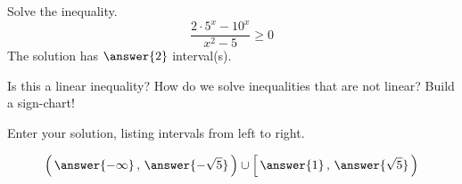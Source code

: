 \documentclass{ximera}
\author{Bobby Ramsey}
\begin{document}
\begin{exercise}
	Solve the inequality.
	\[ \frac{2\cdot 5^x - 10^x}{x^2-5} \geq 0 \]
	The solution has $\answer{2}$ interval(s).
	\begin{hint}
		Is this a linear inequality?  How do we solve inequalities that are not linear?  Build a sign-chart!
	\end{hint}
	\begin{exercise}
		Enter your solution, listing intervals from left to right.
		
		\[ \left( \, \answer{-\infty} \, , \, \answer{-\sqrt{5}} \, \right) \cup  \left[ \, \answer{1} \, , \, \answer{\sqrt{5}} \, \right) \]
		
	\end{exercise}
\end{exercise}
\end{document}
